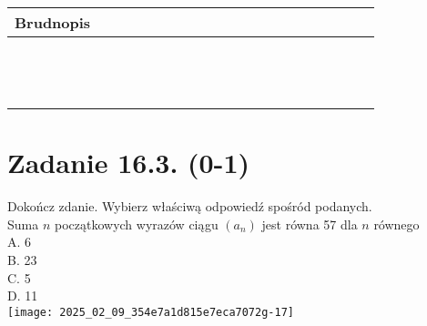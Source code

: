 \documentclass[10pt]{article}
\begin{document}
\begin{center}
\begin{tabular}{|c|c|c|c|c|c|c|c|c|c|c|c|c|c|c|c|c|c|c|c|c|c|c|}
\hline
\multicolumn{4}{|l|}{Brudnopis} &  &  &  &  &  &  &  &  &  &  &  &  &  &  &  &  &  &  &  \\
\hline
 &  &  &  &  &  &  &  &  &  &  &  &  &  &  &  &  &  &  &  &  &  &  \\
\hline
 &  &  &  &  &  &  &  &  &  &  &  &  &  &  &  &  &  &  &  &  &  &  \\
\hline
 &  &  &  &  &  &  &  &  &  &  &  &  &  &  &  &  &  &  &  &  &  &  \\
\hline
 &  &  &  &  &  &  &  &  &  &  &  &  &  &  &  &  &  &  &  &  &  &  \\
\hline
 &  &  &  &  &  &  &  &  &  &  &  &  &  &  &  &  &  &  &  &  &  &  \\
\hline
 &  &  &  &  &  &  &  &  &  &  &  &  &  &  &  &  &  &  &  &  &  &  \\
\hline
 &  &  &  &  &  &  &  &  &  &  &  &  &  &  &  &  &  &  &  &  &  &  \\
\hline
 &  &  &  &  &  &  &  &  &  &  &  &  &  &  &  &  &  &  &  &  &  &  \\
\hline
 &  &  &  &  &  &  &  &  &  &  &  &  &  &  &  &  &  &  &  &  &  &  \\
\hline
 &  &  &  &  &  &  &  &  &  &  &  &  &  &  &  &  &  &  &  &  &  &  \\
\hline
 &  &  &  &  &  &  &  &  &  &  &  &  &  &  &  &  &  &  &  &  &  &  \\
\hline
 &  &  &  &  &  &  &  &  &  &  &  &  &  &  &  &  &  &  &  &  &  &  \\
\hline
 &  &  &  &  &  &  &  &  &  &  &  &  &  &  &  &  &  &  &  &  &  &  \\
\hline
\end{tabular}
\end{center}

\section*{Zadanie 16.3. (0-1)}
Dokończ zdanie. Wybierz właściwą odpowiedź spośród podanych.\\
Suma \(n\) początkowych wyrazów ciągu \(\left(a_{n}\right)\) jest równa 57 dla \(n\) równego\\
A. 6\\
B. 23\\
C. 5\\
D. 11\\
\texttt{[image: 2025\_02\_09\_354e7a1d815e7eca7072g-17]}
\end{document}
